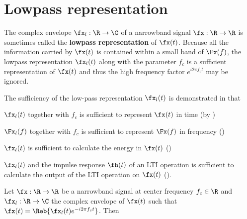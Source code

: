 \section{Lowpass representation}
The complex envelope $\fx_l:\R\to\C$ of a narrowband signal
$\fx:\R\to\R$ is sometimes called the {\bf lowpass representation}
of $\fx(t)$.
Because all the information carried by $\fx(t)$
is contained within a small band of $\Fx(f)$,
the lowpass representation $\fx_l(t)$ along with the parameter $f_c$
is a sufficient representation of $\fx(t)$
and thus the high frequency factor $e^{i2\pi f_c t}$ may be ignored.

The sufficiency of the low-pass representation $\fx_l(t)$
is demonstrated in that
\begin{enume}
   \item $\fx_l(t)$ together with $f_c$ is sufficient to represent
         $\fx(t)$ in time (by )
   \item $\Fx_l(f)$ together with $f_c$ is sufficient to represent
         $\Fx(f)$ in frequency ()
   \item $\fx_l(t)$ is sufficient to calculate the energy in $\fx(t)$
         ()
   \item $\fx_l(t)$ and the impulse response $\fh(t)$ of an LTI operation
         is sufficient to calculate the output of the LTI operation
         on $\fx(t)$ ().
\end{enume}
\begin{theorem}
\label{thm:xxl}
Let $\fx:\R\to\R$ be a narrowband signal at center frequency $f_c\in\R$
and $\fx_l:\R\to\C$ the complex envelope of $\fx(t)$ such that
  $\fx(t) = \Reb{\fx_l(t) e^{-i2\pi f_c t}}$.
Then
\end{theorem}
